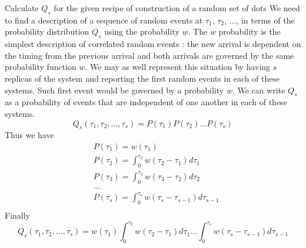 

Calculate $Q_s$ for the given recipe of construction of a random set of dots
We need to find a description of a sequence of random events at $\tau_1$, $\tau_2$, ..., in terms of the probability distribution $Q_s$ using the probability $w$. The $w$ probability is the simplest description of correlated random events : the new arrival is dependent on the timing from the previous arrival and both arrivals are governed by the same probability function $w$. We may as well represent this situation by having $s$ replicas of the system and reporting the first random events in each of these systems. Such first event would be governed by a probability $w$. We can write $Q_s$ as a probability of events that are independent of one another in each of these systems.
\begin{equation}
Q_s(\tau_1, \tau_2,...,\tau_s)=P(\tau_1)P(\tau_2)...P(\tau_s)
\end{equation}
Thus we have
\begin{equation}
\begin{split}
& P(\tau_1)= w(\tau_1) \\
& P(\tau_2)= \int_{0}^{\tau_2}w(\tau_2-\tau_1)d\tau_1\\
& P(\tau_3)=  \int_{0}^{\tau_3}w(\tau_3-\tau_2)d\tau_2\\
& ... \\
& P(\tau_s)=  \int_{0}^{\tau_s}w(\tau_s-\tau_{s-1})d\tau_{s-1}\\
\end{split}
\end{equation}
Finally
\begin{equation}
Q_s(\tau_1, \tau_2,...,\tau_s)=w(\tau_1)\int_{0}^{\tau_2}w(\tau_2-\tau_1)d\tau_1...\int_{0}^{\tau_s}w(\tau_s-\tau_{s-1})d\tau_{s-1}
\end{equation}